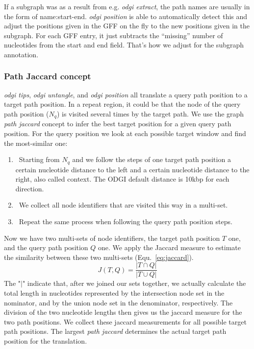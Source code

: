 \documentclass{bioinfo}
\begin{document}
If a subgraph was as a result from e.g. \textit{odgi extract}, the path names are usually in the form of name:start-end. \textit{odgi position} is able to automatically detect this and adjust the positions given in the GFF on the fly to the new positions given in the subgraph. For each GFF entry, it just subtracts the “missing” number of nucleotides from the start and end field. That’s how we adjust for the subgraph annotation.

\subsubsection{Path Jaccard concept}
\label{sec:supp_path_jaccard}
\textit{odgi tips}, \textit{odgi untangle}, and \textit{odgi position} all translate a query path position to a target path position. In a repeat region, it could be that the node of the query path position ($N_q$) is visited several times by the target path. We use the graph \textit{path jaccard} concept to infer the best target position for a given query path position. For the query position we look at each possible target window and find the most-similar one: 
\begin{enumerate}
	\item~Starting from $N_q$ and we follow the steps of one target path position a certain nucleotide distance to the left and a certain nucleotide distance to the right, also called context. The ODGI default distance is 10kbp for each direction.
	\item~We collect all node identifiers that are visited this way in a multi-set.
	\item~Repeat the same process when following the query path position steps.
\end{enumerate}
Now we have two multi-sets of node identifiers, the target path position $T$ one, and the query path position $Q$ one. We apply the Jaccard measure to estimate the similarity between these two multi-sets (Equ.~\ref{eq:jaccard}).
\begin{equation}
	J(T,Q)=\frac{|T\cap Q|}{|T\cup Q|}
	\label{eq:jaccard}
\end{equation}
The "$|$" indicate that, after we joined our sets together, we actually calculate the total length in nucleotides represented by the intersection node set in the nominator, and by the union node set in the denominator, respectively. The division of the two nucleotide lengths then gives us the jaccard measure for the two path positions.
We collect these jaccard measurements for all possible target path positions. The largest \textit{path jaccard} determines the actual target path position for the translation.
\end{document}
